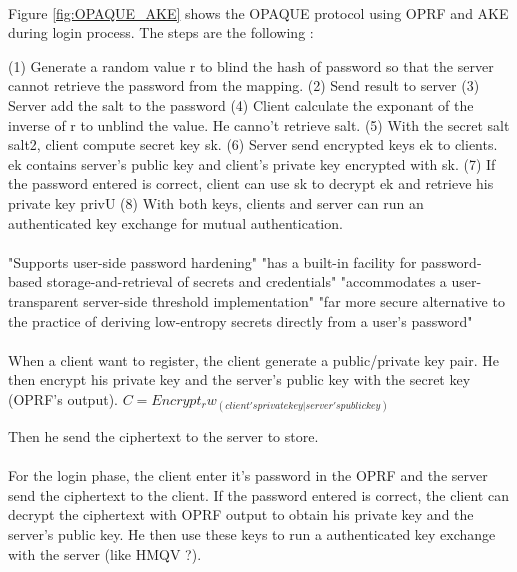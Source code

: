 \documentclass[../report.tex]{subfiles}
\begin{document}
\paragraph{}

Figure \ref{fig:OPAQUE_AKE} shows the OPAQUE protocol using OPRF and AKE during login process.
The steps are the following :

(1) Generate a random value r to blind the hash of password so that the server cannot retrieve the password from the mapping.
(2) Send result to server
(3) Server add the salt to the password
(4) Client calculate the exponant of the inverse of r to unblind the value. He canno't retrieve salt.
(5) With the secret salt salt2, client compute secret key sk.
(6) Server send encrypted keys ek to clients. ek contains server's public key and client's private key encrypted with sk.
(7) If the password entered is correct, client can use sk to decrypt ek and retrieve his private key privU
(8) With both keys, clients and server can run an authenticated key exchange for mutual authentication.

\paragraph{}

     "Supports user-side password hardening"
     "has a built-in facility for password-based storage-and-retrieval of secrets and credentials"
     "accommodates a user-transparent server-side threshold implementation"
     "far more secure alternative to the practice of deriving low-entropy secrets directly from a user's password"


\paragraph{}
When a client want to register, the client generate a public/private key pair. He then encrypt his private key and the server's public key with the secret key (OPRF's output).
$C = Encrypt_rw_(client's private key | server's public key)$

Then he send the ciphertext to the server to store.


\paragraph{}
For the login phase, the client enter it's password in the OPRF and the server send the ciphertext to the client.
If the password entered is correct, the client can decrypt the ciphertext with OPRF output to obtain his private key and the server's public key.
He then use these keys to run a authenticated key exchange with the server (like HMQV ?).
\end{document}
